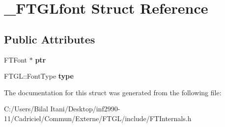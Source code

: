 \hypertarget{struct___f_t_g_lfont}{}\section{\+\_\+\+F\+T\+G\+Lfont Struct Reference}
\label{struct___f_t_g_lfont}
\subsection*{Public Attributes}
\begin{DoxyCompactItemize}
\item 
F\+T\+Font $\ast$ {\bfseries ptr}\hypertarget{struct___f_t_g_lfont_a8bc834719ce209cd1ecc385b75e363b2}{}\label{struct___f_t_g_lfont_a8bc834719ce209cd1ecc385b75e363b2}

\item 
F\+T\+G\+L\+::\+Font\+Type {\bfseries type}\hypertarget{struct___f_t_g_lfont_a1809096d837d4099e0470aa83a061ada}{}\label{struct___f_t_g_lfont_a1809096d837d4099e0470aa83a061ada}

\end{DoxyCompactItemize}


The documentation for this struct was generated from the following file\+:\begin{DoxyCompactItemize}
\item 
C\+:/\+Users/\+Bilal Itani/\+Desktop/inf2990-\/11/\+Cadriciel/\+Commun/\+Externe/\+F\+T\+G\+L/include/F\+T\+Internals.\+h\end{DoxyCompactItemize}
